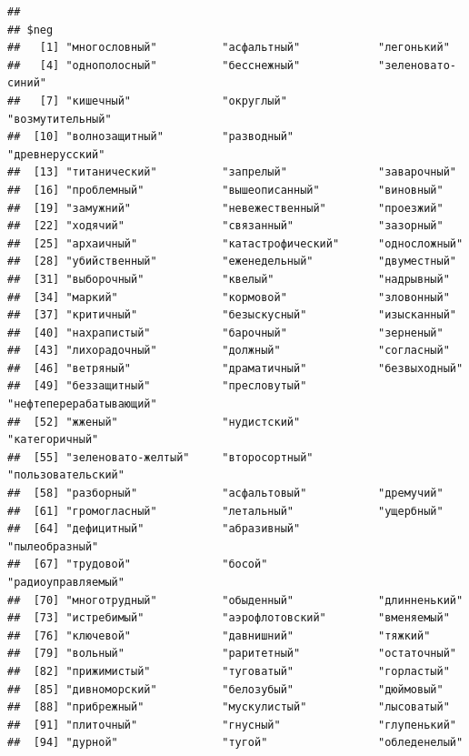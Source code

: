 \documentclass[11pt]{article}\usepackage[]{graphicx}\usepackage[]{color}
\makeatletter
\newenvironment{kframe}{%
 \def\at@end@of@kframe{}%
 \ifinner\ifhmode%
  \def\at@end@of@kframe{\end{minipage}}%
  \begin{minipage}{\columnwidth}%
 \fi\fi%
 \def\FrameCommand##1{\hskip\@totalleftmargin \hskip-\fboxsep
 \colorbox{shadecolor}{##1}\hskip-\fboxsep
     \hskip-\linewidth \hskip-\@totalleftmargin \hskip\columnwidth}%
 \MakeFramed {\advance\hsize-\width
   \@totalleftmargin\z@ \linewidth\hsize
   \@setminipage}}%
 {\par\unskip\endMakeFramed%
 \at@end@of@kframe}
\newenvironment{knitrout}{}{} %
\makeatother
\begin{document}
\begin{knitrout}
\begin{kframe}
\begin{verbatim}
## 
## $neg
##   [1] "многословный"          "асфальтный"            "легонький"            
##   [4] "однополосный"          "бесснежный"            "зеленовато-синий"     
##   [7] "кишечный"              "округлый"              "возмутительный"       
##  [10] "волнозащитный"         "разводный"             "древнерусский"        
##  [13] "титанический"          "запрелый"              "заварочный"           
##  [16] "проблемный"            "вышеописанный"         "виновный"             
##  [19] "замужний"              "невежественный"        "проезжий"             
##  [22] "ходячий"               "связанный"             "зазорный"             
##  [25] "архаичный"             "катастрофический"      "односложный"          
##  [28] "убийственный"          "еженедельный"          "двуместный"           
##  [31] "выборочный"            "квелый"                "надрывный"            
##  [34] "маркий"                "кормовой"              "зловонный"            
##  [37] "критичный"             "безыскусный"           "изысканный"           
##  [40] "нахрапистый"           "барочный"              "зерненый"             
##  [43] "лихорадочный"          "должный"               "согласный"            
##  [46] "ветряный"              "драматичный"           "безвыходный"          
##  [49] "беззащитный"           "пресловутый"           "нефтеперерабатывающий"
##  [52] "жженый"                "нудистский"            "категоричный"         
##  [55] "зеленовато-желтый"     "второсортный"          "пользовательский"     
##  [58] "разборный"             "асфальтовый"           "дремучий"             
##  [61] "громогласный"          "летальный"             "ущербный"             
##  [64] "дефицитный"            "абразивный"            "пылеобразный"         
##  [67] "трудовой"              "босой"                 "радиоуправляемый"     
##  [70] "многотрудный"          "обыденный"             "длинненький"          
##  [73] "истребимый"            "аэрофлотовский"        "вменяемый"            
##  [76] "ключевой"              "давнишний"             "тяжкий"               
##  [79] "вольный"               "раритетный"            "остаточный"           
##  [82] "прижимистый"           "туговатый"             "горластый"            
##  [85] "дивноморский"          "белозубый"             "дюймовый"             
##  [88] "прибрежный"            "мускулистый"           "лысоватый"            
##  [91] "плиточный"             "гнусный"               "глупенький"           
##  [94] "дурной"                "тугой"                 "обледенелый"          

\end{verbatim}
\end{kframe}
\end{knitrout}
\end{document}
